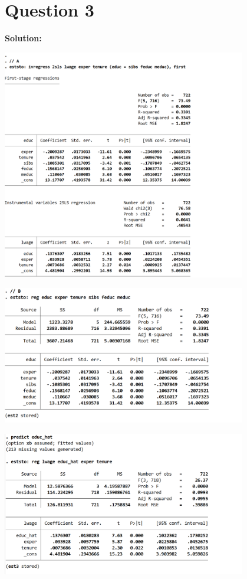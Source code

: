 \documentclass[12pt, oneside]{article}
\begin{document}
\section{Question 3}
\textbf{Solution:}

\begin{center}

    \includegraphics[width=0.8\textwidth]{Figure/P3.1.jpg}

    \includegraphics[width=0.8\textwidth]{Figure/P3.2.jpg}  

    \includegraphics[width=0.8\textwidth]{Figure/P3.3.jpg}


\end{center}
\end{document}
